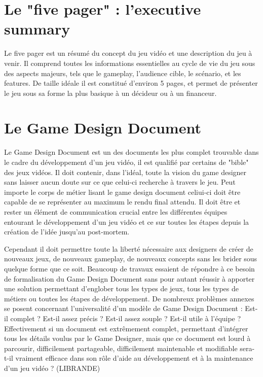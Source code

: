 \section{Le "five pager" : l'executive summary }
Le five pager est un résumé du concept du jeu vidéo et une description du jeu à venir. Il comprend toutes les informations essentielles au cycle de vie du jeu sous des aspects majeurs, tels que le gameplay, l'audience cible, le scénario, et les features. De taille idéale il est constitué d'environ 5 pages, et permet de présenter le jeu sous sa forme la plus basique à un décideur ou à un financeur.

\section{Le Game Design Document}





Le Game Design Document est un des documents les plus complet trouvable dans le cadre du développement d'un jeu vidéo, il est qualifié par certains de "bible" des jeux vidéos. Il doit contenir, dans l'idéal, toute la vision du game designer sans laisser aucun doute sur ce que celui-ci recherche à travers le jeu. Peut importe le corps de métier lisant le game design document celiui-ci doit être capable de se représenter au maximum le rendu final attendu. Il doit être et rester un élément de communication crucial entre les différentes équipes entourant le développement d'un jeu vidéo et ce sur toutes les étapes depuis la création de l'idée jusqu'au post-mortem.

Cependant il doit permettre toute la liberté nécessaire aux designers de créer de nouveaux jeux, de nouveaux gameplay, de nouveaux concepts sans les brider sous quelque forme que ce soit. Beaucoup de travaux essaient de répondre à ce besoin de formalisation du Game Design Document sans pour autant réussir à apporter une solution permettant d'englober tous les types de jeux, tous les types de métiers ou toutes les étapes de développement. De nombreux problèmes annexes se posent concernant l'universalité d'un modèle de Game Design Document : Est-il complet ? Est-il assez précis ? Est-il assez souple ? Est-il utile à l'équipe ? Effectivement si un document est extrêmement complet, permettant d'intégrer tous les détails voulus par le Game Designer, mais que ce document est lourd à parcourir, difficilement partageable, difficilement maintenable et modifiable sera-t-il vraiment efficace dans son rôle d'aide au développement et à la maintenance d'un jeu vidéo ? (LIBRANDE)

